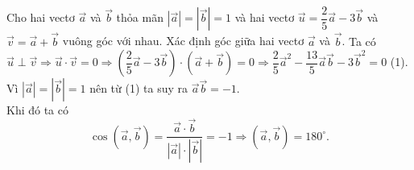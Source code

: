 
\begin{bt}%
	Cho hai vectơ $\overrightarrow{a}$ và $\overrightarrow{b}$ thỏa mãn $\left |\overrightarrow{a} \right |=\left |\overrightarrow{b} \right |=1$ và hai vectơ $\overrightarrow{u}=\dfrac{2}{5}\overrightarrow{a}-3\overrightarrow{b}$ và $\overrightarrow{v}=\overrightarrow{a}+\overrightarrow{b}$ vuông góc với nhau. Xác định góc giữa hai vectơ $\overrightarrow{a}$ và $\overrightarrow{b}$.
	\loigiai
	{
	Ta có $\overrightarrow{u}\perp\overrightarrow{v}\Rightarrow\overrightarrow{u}\cdot\overrightarrow{v}=0\Rightarrow\left (\dfrac{2}{5}\overrightarrow{a}-3\overrightarrow{b} \right )\cdot\left (\overrightarrow{a}+\overrightarrow{b} \right )=0\Rightarrow \dfrac{2}{5}\overrightarrow{a}^2-\dfrac{13}{5}\overrightarrow{a}\overrightarrow{b}-3\overrightarrow{b}^2=0$ (1).\\
	Vì $\left |\overrightarrow{a} \right |=\left |\overrightarrow{b} \right |=1$ nên từ (1) ta suy ra $\overrightarrow{a}\overrightarrow{b}=-1$.\\
	Khi đó ta có $$\cos\left (\overrightarrow{a},\overrightarrow{b} \right )=\dfrac{\overrightarrow{a}\cdot\overrightarrow{b}}{\left |\overrightarrow{a} \right |\cdot\left |\overrightarrow{b} \right |}=-1\Rightarrow\left (\overrightarrow{a},\overrightarrow{b} \right )=180^{\circ}.$$
	}
\end{bt}

